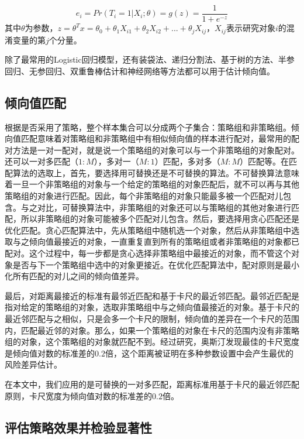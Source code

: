 \begin{equation}
e_i = Pr(T_i=1|X_i;\theta)=g(z)=\frac{1}{1+e^{-z}}
\end{equation}
其中$\theta$为参数，$z=\theta^Tx=\theta_0+\theta_1X_{i1}+\theta_2X_{i2}+...+\theta_jX_{ij}$，$X_{ij}$表示研究对象$i$的混淆变量的第$j$个分量。

除了最常用的Logistic回归模型，还有装袋法、递归分割法、基于树的方法、半参回归、无参回归、双重鲁棒估计和神经网络等方法都可以用于估计倾向值。

\subsection{倾向值匹配}

根据是否采用了策略，整个样本集合可以分成两个子集合：策略组和非策略组。倾向值匹配意味着对策略组和非策略组中有相似倾向值的样本进行配对，最常用的配对方法是一对一配对，就是说一个策略组的对象可以与一个非策略组的对象配对。还可以一对多匹配（$1:M$），多对一（$M:1$）匹配，多对多（$M:M$）匹配等。在匹配算法的选取上，首先，要选择用可替换还是不可替换的算法。不可替换算法意味着一旦一个非策略组的对象与一个给定的策略组的对象匹配后，就不可以再与其他策略组的对象进行匹配。因此，每个非策略组的对象只能最多被一个匹配对儿包含。与之对比，可替换算法中，非策略组的对象还可以与策略组的其他对象进行匹配，所以非策略组的对象可能被多个匹配对儿包含。然后，要选择用贪心匹配还是优化匹配。贪心匹配算法中，先从策略组中随机选一个对象，然后从非策略组中选取与之倾向值最接近的对象，一直重复直到所有的策略组或者非策略组的对象都已配对。这个过程中，每一步都是贪心选择非策略组中最接近的对象，而不管这个对象是否与下一个策略组中选中的对象更接近。在优化匹配算法中，配对原则是最小化所有匹配的对儿之间的倾向值差异。

最后，对距离最接近的标准有最邻近匹配和基于卡尺的最近邻匹配。最邻近匹配是指对给定的策略组的对象，选取非策略组中与之倾向值最接近的对象。基于卡尺的最近邻匹配与之相似，只是会多一个卡尺的限制，倾向值的差异在一个卡尺的范围内，匹配最近邻的对象。那么，如果一个策略组的对象在卡尺的范围内没有非策略组的对象，这个策略组的对象就匹配不到。经过研究，奥斯汀\cite{austin2011optimal}发现最佳的卡尺宽度是倾向值对数的标准差的$0.2$倍，这个距离被证明在多种参数设置中会产生最优的风险差异估计。

在本文中，我们应用的是可替换的一对多匹配，距离标准用基于卡尺的最近邻匹配原则，卡尺宽度为倾向值对数的标准差的$0.2$倍。

\subsection{评估策略效果并检验显著性}

